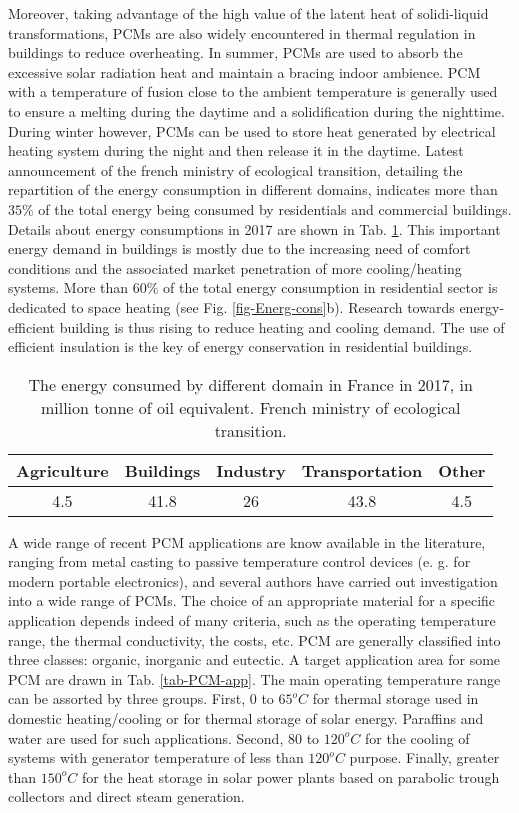 Moreover, taking advantage of the high value of the latent heat of solidi-liquid transformations, PCMs are also widely encountered in thermal regulation in buildings to reduce overheating.
In summer, PCMs are used to absorb the excessive solar radiation heat and maintain a bracing indoor ambience.
PCM with a temperature of fusion close to the ambient temperature is generally used to ensure a melting during the daytime and a solidification during the nighttime.
During winter however, PCMs can be used to store heat generated by electrical heating system during the night and then release it in the daytime.
Latest announcement of the french ministry of ecological transition, detailing the repartition of the energy consumption in different domains, indicates more than $35 \%$ of the total energy being consumed by residentials and commercial buildings. Details about energy consumptions in 2017 are shown in Tab. \ref{tab-french-min}.
This important energy demand in buildings is mostly due to the increasing need of comfort conditions and the associated market penetration of more cooling/heating systems.
More than $60\%$ of the total energy consumption in residential sector is dedicated to space heating (see Fig. \ref{fig-Energ-cons}b).
Research towards energy-efficient building is thus rising to reduce heating and cooling demand.
The use of efficient insulation is the key of energy conservation in residential buildings.

\begin{table}
	\begin{center}
		\begin{tabular}{ccccc}
			Agriculture & Buildings & Industry  & Transportation & Other  \\ \hline
			4.5 & 41.8 & 26 & 43.8 & 4.5 \\
		\end{tabular}
	\end{center}
	\caption {The energy consumed by different domain in France in 2017, in million tonne of oil equivalent. French ministry of ecological transition.}
	\label{tab-french-min}
\end{table}

A wide range of recent PCM applications are know available in the literature, ranging from metal casting to passive temperature control devices (e. g. for modern portable electronics), and several authors have carried out investigation into a wide range of PCMs.
The choice of an appropriate material for a specific application depends indeed of many criteria, such as the operating temperature range, the thermal conductivity, the costs, etc.
PCM are generally classified into three classes: organic, inorganic and eutectic.
A target application area for some PCM are drawn in Tab. \ref{tab-PCM-app}.
The main operating temperature range can be assorted by three groups. First, $0$ to $65 ^o C$ for thermal storage used in domestic heating/cooling or for thermal storage of solar energy. Paraffins and water are used for such applications.
Second, $80$ to $120 ^o C$ for the cooling of systems with generator temperature of less than $120 ^o C$ purpose.
Finally, greater than $150 ^o C$ for the heat storage in solar power plants based on parabolic trough collectors and direct steam generation.


